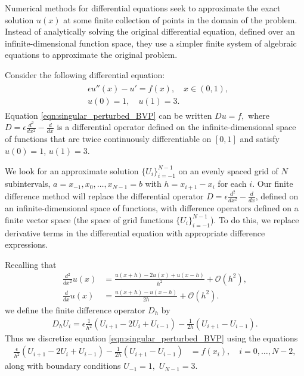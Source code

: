 Numerical methods for differential equations seek to approximate the exact solution $u(x)$ at some finite collection of points in the domain of the problem.
Instead of analytically solving the original differential equation, defined over an infinite-dimensional function space, they use a simpler finite system of algebraic equations to approximate the original problem.
 
Consider the following differential equation: 
\begin{align}
	\begin{split}
	&{ } \epsilon u''(x)-u'= f(x), \quad x \in (0,1), \\
	&{ } u(0) = 1, \quad u(1) = 3.
	\end{split} \label{eqn:singular_perturbed_BVP}
\end{align}
Equation \eqref{eqn:singular_perturbed_BVP} can be written $D u = f,$ where $D = \epsilon \frac{d^2}{dx^2} - \frac{d}{dx}$ is a differential operator defined on the infinite-dimensional space of functions that are twice continuously differentiable on $[0,1]$ and satisfy $u(0) = 1$, $u(1) = 3$.

We look for an approximate solution $\{U_i\}_{i=-1}^{N-1}$ on an evenly spaced grid of $N$ subintervals, $a = x_{-1}, x_0, \ldots, x_{N-1} = b$ with $h = x_{i+1}-x_i$ for each $i$.
Our finite difference method will replace the differential operator $D = \epsilon \frac{d^2}{dx^2} - \frac{d}{dx}$, defined on an infinite-dimensional space of functions, with difference operators defined on a finite vector space (the space of grid functions $\{U_i\}_{i=-1}^{N-1}$).
To do this, we replace derivative terms in the differential equation with appropriate difference expressions.

Recalling that 
\begin{align*}
	\frac{d^2}{dx^2} u(x) &= \frac{u(x+h)- 2u(x) + u(x-h)}{h^2} + \mathcal{O}(h^2),\\
\frac{d}{dx} u(x) &= \frac{u(x+h)-u(x-h)}{2h} + \mathcal{O}(h^2).
\end{align*}
we define the finite difference operator $D_h$ by  
\begin{align}
D_h U_i = \epsilon \frac{1}{h^2}\left(U_{i+1} -2U_i + U_{i-1}\right) - \frac{1}{2h} \left(U_{i+1}-U_{i-1} \right). \label{fd_operator}
\end{align}
Thus we discretize equation \eqref{eqn:singular_perturbed_BVP} using the equations 
\begin{align*}
	\frac{\epsilon}{h^2} (U_{i+1}- 2U_i + U_{i-1}) - \frac{1}{2h} \left(U_{i+1}-U_{i-1} \right)  &= f(x_i), \quad i = 0, \ldots, N-2,
\end{align*}
along with boundary conditions $U_{-1} = 1,$ $U_{N-1} = 3$.


